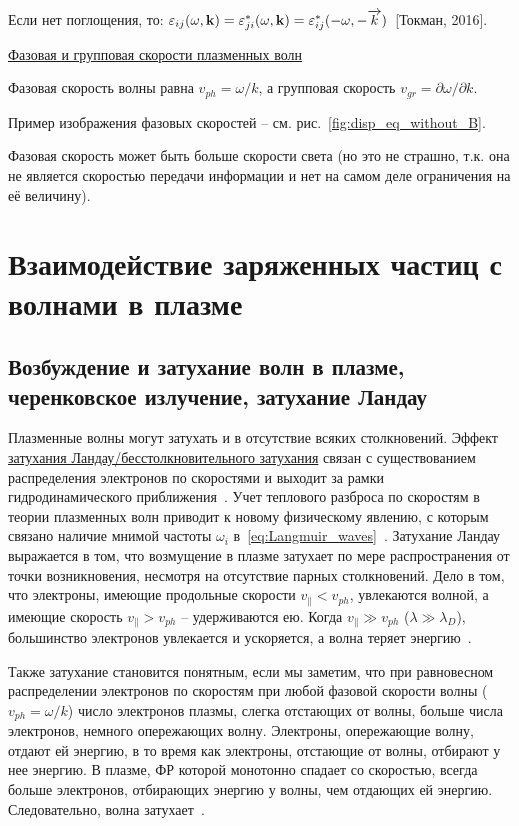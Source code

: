 \documentclass[10pt, a4paper]{article}
\newcommand{\Tokman}{~[Токман, 2016]}
\let\stdsection\section
\renewcommand\section{\newpage\stdsection}
\begin{document}
Если нет поглощения, то: $\varepsilon_{ij}(\omega, \vb{k})=\varepsilon_{ji}^{*}(\omega, \vb{k})=\varepsilon_{ij}^{*}(-\omega, -\overrightarrow{k})$\Tokman.

\uline{Фазовая и групповая скорости плазменных волн}

Фазовая скорость волны равна $v_{ph} = \omega/k$,
а групповая скорость $v_{gr} = \partial\omega/\partial k$.

Пример изображения фазовых скоростей -- см. рис.~\ref{fig:disp_eq_without_B}.

Фазовая скорость может быть больше скорости света (но это не страшно, т.к. она не является скоростью передачи информации и нет на самом деле ограничения на её величину).

\section{Взаимодействие заряженных частиц с волнами в плазме}
 
\subsection{Возбуждение и затухание волн в плазме, черенковское излучение, затухание Ландау} \label{subsec:Landau_damping}

Плазменные волны могут затухать и в отсутствие всяких столкновений. Эффект \uline{затухания Ландау/бесстолкновительного затухания} связан с существованием распределения
электронов по скоростями и выходит за рамки гидродинамического приближения~\cite{raizer}. Учет теплового разброса по скоростям в теории плазменных волн приводит к новому физическому явлению, с которым связано наличие мнимой
частоты $\omega_i$ в~\eqref{eq:Langmuir_waves}~\cite{kroll}. Затухание Ландау выражается в том, что возмущение в плазме затухает по мере распространения от точки возникновения, несмотря на отсутствие парных столкновений. Дело в том, что электроны, имеющие продольные
скорости $v_\parallel<v_{ph}$, увлекаются волной, а имеющие скорость $v_\parallel>v_{ph}$ -- удерживаются ею. Когда $v_\parallel\gg v_{ph}$ ($\lambda\gg\lambda_D$), большинство электронов увлекается и ускоряется, а волна теряет энергию~\cite{raizer}.

Также затухание становится понятным, если мы заметим, что при равновесном распределении электронов по скоростям при любой фазовой скорости волны ($v_{ph} = \omega/k$) число электронов плазмы, слегка отстающих от волны, больше числа электронов, немного опережающих волну. Электроны, опережающие волну, отдают ей энергию, в то время как электроны, отстающие от волны, отбирают у нее энергию. В плазме, ФР которой монотонно спадает со скоростью, всегда больше электронов, отбирающих энергию у волны, чем отдающих ей энергию. Следовательно, волна затухает~\cite{kroll}.
\end{document}
